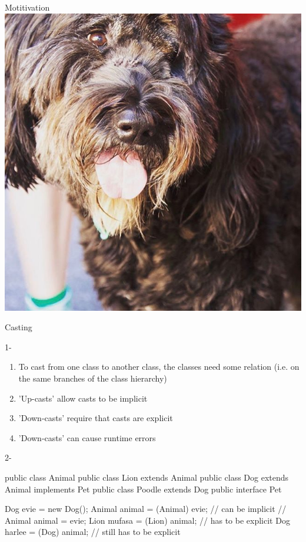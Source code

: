 \documentclass[week3]{csse2002}
\begin{document}
\begin{topic}{Motitivation}
\includegraphics[width=\textwidth,keepaspectratio]{doggo.jpg}
\end{topic}

\begin{topic}{Casting}
\begin{subtopic}{1-}
\begin{enumerate}
	\item To cast from one class to another class, the classes need some relation (i.e. on the same branches of the class hierarchy)
	\item 'Up-casts' allow casts to be implicit
	\item 'Down-casts' require that casts are explicit
	\item 'Down-casts' can cause runtime errors
\end{enumerate}
\end{subtopic}

\begin{subtopic}{2-}
\begin{java}
public class Animal {}
public class Lion extends Animal {}
public class Dog extends Animal implements Pet {}
public class Poodle extends Dog {}
public interface Pet {}

Dog evie = new Dog();
Animal animal = (Animal) evie; // can be implicit
// Animal animal = evie;
Lion mufasa = (Lion) animal; // has to be explicit
Dog harlee = (Dog) animal; // still has to be explicit
\end{java}
\end{subtopic}
\end{topic}
\end{document}
